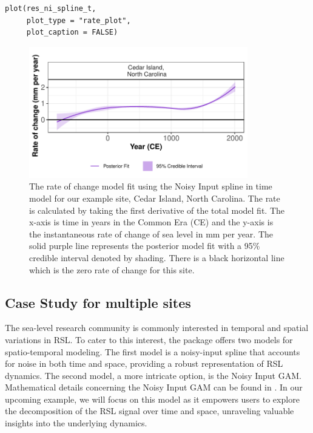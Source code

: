 \scriptsize

\begin{verbatim}
plot(res_ni_spline_t,
     plot_type = "rate_plot",
     plot_caption = FALSE)
\end{verbatim}

\begin{figure}

{\centering \includegraphics[width=360px]{RJ-2024-018_files/figure-latex/nisplinemodrate-1} 

}

\caption{The rate of change model fit using the Noisy Input spline in time model for our example site, Cedar Island, North Carolina. The rate is calculated by taking the first derivative of the total model fit. The x-axis is time in years in the Common Era (CE) and the y-axis is the instantaneous rate of change of sea level in mm per year. The solid purple line represents the posterior model fit with a 95\% credible interval denoted by shading. There is a black horizontal line which is the zero rate of change for this site.}\label{fig:nisplinemodrate}
\end{figure}

\normalsize

\subsection{Case Study for multiple sites}\label{casestudy2}

The sea-level research community is commonly interested in temporal and spatial variations in RSL. To cater to this interest, the  package offers two models for spatio-temporal modeling. The first model is a noisy-input spline that accounts for noise in both time and space, providing a robust representation of RSL dynamics. The second model, a more intricate option, is the Noisy Input GAM. Mathematical details concerning the Noisy Input GAM can be found in \citet{Upton2023noisy}. In our upcoming example, we will focus on this model as it empowers users to explore the decomposition of the RSL signal over time and space, unraveling valuable insights into the underlying dynamics.

